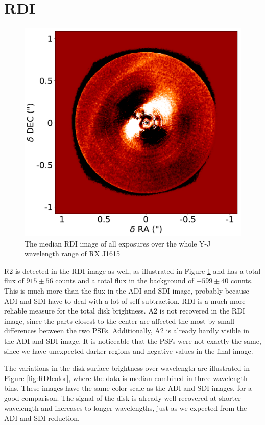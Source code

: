 \documentclass[twoside,single,12pt]{lion-msc}
\begin{document}
\section{RDI}
\begin{figure}
\vspace{-6mm}
\centering
\includegraphics[width=\linewidth]{RDI_tot_smallimcon}
\caption{The median RDI image of all exposures over the whole Y-J wavelength range of RX J1615}
\label{fig:RDI_tot}
\vspace{-4mm}
\end{figure}

R2 is detected in the RDI image as well, as illustrated in Figure \ref{fig:RDI_tot} and has a total flux of $915 \pm 56$ counts and a total flux in the background of $-599 \pm 40$ counts. This is much more than the flux in the ADI and SDI image, probably because ADI and SDI have to deal with a lot of self-subtraction. RDI is a much more reliable measure for the total disk brightness. A2 is not recovered in the RDI image, since the parts closest to the center are affected the most by small differences between the two PSFs. Additionally, A2 is  already hardly visible in the ADI and SDI image. It is noticeable that the PSFs were not exactly the same, since we have unexpected darker regions and negative values in the final image.
\bigskip

The variations in the disk surface brightness over wavelength are illustrated in Figure \ref{fig:RDIcolor}, where the data is median combined in three wavelength bins. These images have the same color scale as the ADI and SDI images, for a good comparison. The signal of the disk is already well recovered at shorter wavelength and increases to longer wavelengths, just as we expected from the ADI and SDI reduction.
\end{document}
